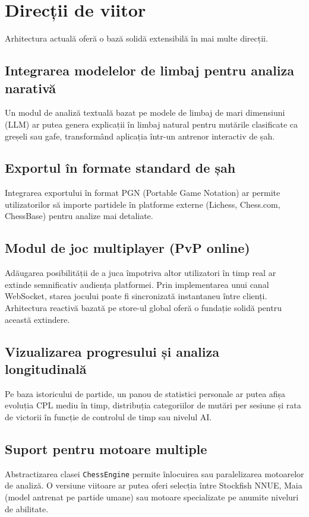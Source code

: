 \documentclass[12pt,a4paper]{article}
\begin{document}
\newpage
\section{Direcții de viitor}

Arhitectura actuală oferă o bază solidă extensibilă în mai multe direcții.

\subsection{Integrarea modelelor de limbaj pentru analiza narativă}
Un modul de analiză textuală bazat pe modele de limbaj de mari dimensiuni (LLM) ar putea genera explicații în limbaj natural pentru mutările clasificate ca greșeli sau gafe, transformând aplicația într-un antrenor interactiv de șah.

\subsection{Exportul în formate standard de șah}
Integrarea exportului în format PGN (Portable Game Notation) ar permite utilizatorilor să importe partidele în platforme externe (Lichess, Chess.com, ChessBase) pentru analize mai detaliate.

\subsection{Modul de joc multiplayer (PvP online)}
Adăugarea posibilității de a juca împotriva altor utilizatori în timp real ar extinde semnificativ audiența platformei. Prin implementarea unui canal WebSocket, starea jocului poate fi sincronizată instantaneu între clienți. Arhitectura reactivă bazată pe store-ul global oferă o fundație solidă pentru această extindere.

\subsection{Vizualizarea progresului și analiza longitudinală}
Pe baza istoricului de partide, un panou de statistici personale ar putea afișa evoluția CPL mediu în timp, distribuția categoriilor de mutări per sesiune și rata de victorii în funcție de controlul de timp sau nivelul AI.

\subsection{Suport pentru motoare multiple}
Abstractizarea clasei \texttt{ChessEngine} permite înlocuirea sau paralelizarea motoarelor de analiză. O versiune viitoare ar putea oferi selecția între Stockfish NNUE, Maia (model antrenat pe partide umane) sau motoare specializate pe anumite niveluri de abilitate.
\end{document}
